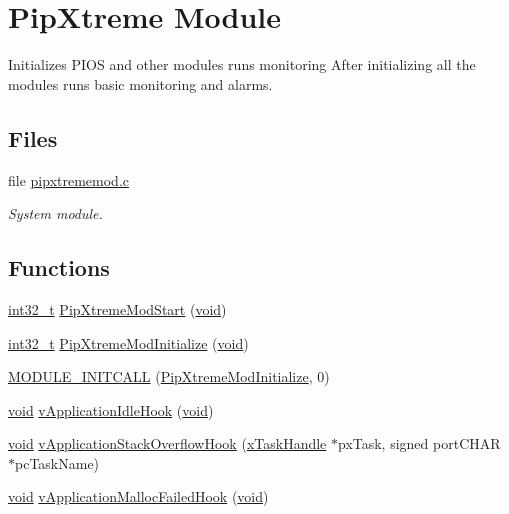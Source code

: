 \hypertarget{group___pip_xtreme_module}{\section{Pip\-Xtreme Module}
\label{group___pip_xtreme_module}
}


Initializes P\-I\-O\-S and other modules runs monitoring After initializing all the modules runs basic monitoring and alarms.  


\subsection*{Files}
\begin{DoxyCompactItemize}
\item 
file \hyperlink{pipxtrememod_8c}{pipxtrememod.\-c}
\begin{DoxyCompactList}\small\item\em System module. \end{DoxyCompactList}\end{DoxyCompactItemize}
\subsection*{Functions}
\begin{DoxyCompactItemize}
\item 
\hyperlink{group___n_a_m_e_gafd12020da5a235dfcf0c3c748fb5baed}{int32\-\_\-t} \hyperlink{group___pip_xtreme_module_gaf807db07678e4bfa45af98ad2ba88231}{Pip\-Xtreme\-Mod\-Start} (\hyperlink{group___n_a_m_e_ga18028b8badbf1ea7e704ccac3c488e82}{void})
\item 
\hyperlink{group___n_a_m_e_gafd12020da5a235dfcf0c3c748fb5baed}{int32\-\_\-t} \hyperlink{group___pip_xtreme_module_ga5328319847f8d7b5abec5b91331b7d8b}{Pip\-Xtreme\-Mod\-Initialize} (\hyperlink{group___n_a_m_e_ga18028b8badbf1ea7e704ccac3c488e82}{void})
\item 
\hyperlink{group___pip_xtreme_module_ga5d5845e9f2be9cbef331306db953f747}{M\-O\-D\-U\-L\-E\-\_\-\-I\-N\-I\-T\-C\-A\-L\-L} (\hyperlink{group___pip_xtreme_module_ga5328319847f8d7b5abec5b91331b7d8b}{Pip\-Xtreme\-Mod\-Initialize}, 0)
\item 
\hyperlink{group___n_a_m_e_ga18028b8badbf1ea7e704ccac3c488e82}{void} \hyperlink{group___pip_xtreme_module_ga97fd430f36f8b065226e2bff9bad1de5}{v\-Application\-Idle\-Hook} (\hyperlink{group___n_a_m_e_ga18028b8badbf1ea7e704ccac3c488e82}{void})
\item 
\hyperlink{group___n_a_m_e_ga18028b8badbf1ea7e704ccac3c488e82}{void} \hyperlink{group___pip_xtreme_module_ga329de0f973fabef8b34da6444654295c}{v\-Application\-Stack\-Overflow\-Hook} (\hyperlink{_common_2_libraries_2_free_r_t_o_s_2_source_2include_2task_8h_a271ae40d5db07d928a113766505a0965}{x\-Task\-Handle} $\ast$px\-Task, signed port\-C\-H\-A\-R $\ast$pc\-Task\-Name)
\item 
\hyperlink{group___n_a_m_e_ga18028b8badbf1ea7e704ccac3c488e82}{void} \hyperlink{group___pip_xtreme_module_gab7e5c95cf72a3f819bc4462a7fb62ca3}{v\-Application\-Malloc\-Failed\-Hook} (\hyperlink{group___n_a_m_e_ga18028b8badbf1ea7e704ccac3c488e82}{void})
\end{DoxyCompactItemize}


